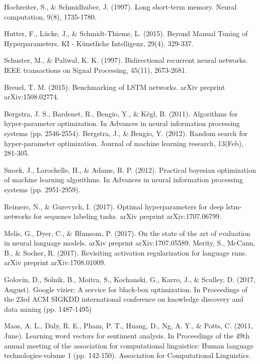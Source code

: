 \documentclass[conference]{IEEEtran}
\begin{document}
\begin{thebibliography}{}


Hochreiter, S., \& Schmidhuber, J. (1997). Long short-term memory. Neural computation, 9(8), 1735-1780.

Hutter, F., Lücke, J., \& Schmidt-Thieme, L. (2015). Beyond Manual Tuning of Hyperparameters. KI - Künstliche Intelligenz, 29(4), 329-337.

Schuster, M., \& Paliwal, K. K. (1997). Bidirectional recurrent neural networks. IEEE transactions on Signal Processing, 45(11), 2673-2681.

Breuel, T. M. (2015). Benchmarking of LSTM networks. arXiv preprint arXiv:1508.02774.

Bergstra, J. S., Bardenet, R., Bengio, Y., \& Kégl, B. (2011). Algorithms for hyper-parameter optimization. In Advances in neural information processing systems (pp. 2546-2554).
Bergstra, J., \& Bengio, Y. (2012). Random search for hyper-parameter optimization. Journal of machine learning research, 13(Feb), 281-305.

Snoek, J., Larochelle, H., \& Adams, R. P. (2012). Practical bayesian optimization of machine learning algorithms. In Advances in neural information processing systems (pp. 2951-2959).

Reimers, N., \& Gurevych, I. (2017). Optimal hyperparameters for deep lstm-networks for sequence labeling tasks. arXiv preprint arXiv:1707.06799.

Melis, G., Dyer, C., \& Blunsom, P. (2017). On the state of the art of evaluation in neural language models. arXiv preprint arXiv:1707.05589.
Merity, S., McCann, B., \& Socher, R. (2017). Revisiting activation regularization for language rnns. arXiv preprint arXiv:1708.01009.

Golovin, D., Solnik, B., Moitra, S., Kochanski, G., Karro, J., \& Sculley, D. (2017, August). Google vizier: A service for black-box optimization. In Proceedings of the 23rd ACM SIGKDD international conference on knowledge discovery and data mining (pp. 1487-1495)

Maas, A. L., Daly, R. E., Pham, P. T., Huang, D., Ng, A. Y., \& Potts, C. (2011, June). Learning word vectors for sentiment analysis. In Proceedings of the 49th annual meeting of the association for computational linguistics: Human language technologies-volume 1 (pp. 142-150). Association for Computational Linguistics.


\end{thebibliography}
\end{document}

